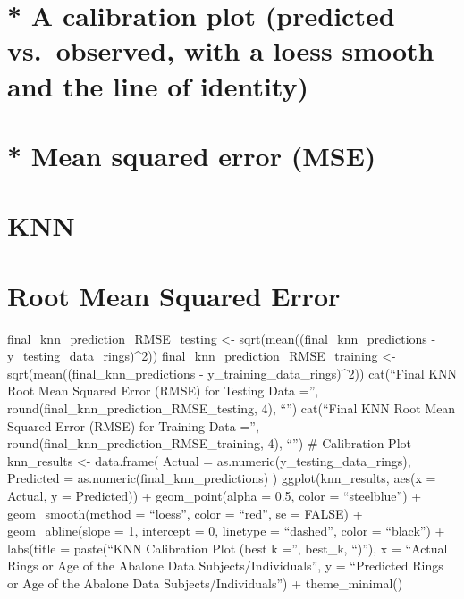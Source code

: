 \documentclass[
  letterpaper,
  DIV=11,
  numbers=noendperiod]{scrreprt}
\begin{document}
{

\chapter{* A calibration plot (predicted vs.~observed, with a loess
smooth and the line of
identity)}\label{a-calibration-plot-predicted-vs.-observed-with-a-loess-smooth-and-the-line-of-identity}


\chapter{* Mean squared error (MSE)}\label{mean-squared-error-mse}


\chapter{KNN}\label{knn}


\chapter{Root Mean Squared Error}\label{root-mean-squared-error}

final\_knn\_prediction\_RMSE\_testing \textless-
sqrt(mean((final\_knn\_predictions - y\_testing\_data\_rings)\^{}2))
final\_knn\_prediction\_RMSE\_training \textless-
sqrt(mean((final\_knn\_predictions - y\_training\_data\_rings)\^{}2))
cat(``Final KNN Root Mean Squared Error (RMSE) for Testing Data ='',
round(final\_knn\_prediction\_RMSE\_testing, 4), ``\n'') cat(``Final KNN
Root Mean Squared Error (RMSE) for Training Data ='',
round(final\_knn\_prediction\_RMSE\_training, 4), ``\n'') \# Calibration
Plot knn\_results \textless- data.frame( Actual =
as.numeric(y\_testing\_data\_rings), Predicted =
as.numeric(final\_knn\_predictions) ) ggplot(knn\_results, aes(x =
Actual, y = Predicted)) + geom\_point(alpha = 0.5, color =
``steelblue'') + geom\_smooth(method = ``loess'', color = ``red'', se =
FALSE) + geom\_abline(slope = 1, intercept = 0, linetype = ``dashed'',
color = ``black'') + labs(title = paste(``KNN Calibration Plot (best k
='', best\_k, ``)''), x = ``Actual Rings or Age of the Abalone Data
Subjects/Individuals'', y = ``Predicted Rings or Age of the Abalone Data
Subjects/Individuals'') + theme\_minimal()

}
\end{document}
